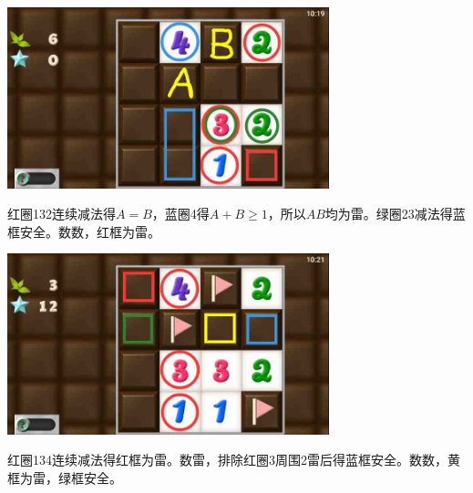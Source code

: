 \subsection{} %
\begin{center}
    \includegraphics[width=0.7\textwidth]{puzzlelow/175-1.jpg}
\end{center}
红圈132连续减法得$A=B$，蓝圈4得$A+B\ge 1$，所以$AB$均为雷。绿圈23减法得蓝框安全。数数，红框为雷。
\begin{center}
    \includegraphics[width=0.7\textwidth]{puzzlelow/175-2.jpg}
\end{center}
红圈134连续减法得红框为雷。数雷，排除红圈3周围2雷后得蓝框安全。数数，黄框为雷，绿框安全。

